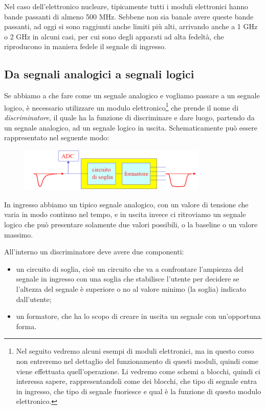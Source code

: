 Nel caso dell'elettronico nucleare, tipicamente tutti i moduli elettronici hanno bande passanti di almeno 500 MHz. Sebbene non sia banale avere queste bande passanti, ad oggi si sono raggiunti anche limiti più alti, arrivando anche a 1 GHz o 2 GHz in alcuni casi, per cui sono degli apparati ad alta fedeltà, che riproducono in maniera fedele il segnale di ingresso.

\subsection{Da segnali analogici a segnali logici}
Se abbiamo a che fare come un segnale analogico e vogliamo passare a un segnale logico, è necessario utilizzare un modulo elettronico\footnote{Nel seguito vedremo alcuni esempi di moduli elettronici, ma in questo corso non entreremo nel dettaglio del funzionamento di questi moduli, quindi come viene effettuata quell'operazione. Li vedremo come schemi a blocchi, quindi ci interessa sapere, rappresentandoli come dei blocchi, che tipo di segnale entra in ingresso, che tipo di segnale fuoriesce e qual è la funzione di questo modulo elettronico.} che prende il nome di \textit{discriminatore}, il quale ha la funzione di discriminare e dare luogo, partendo da un segnale analogico, ad un segnale logico in uscita. Schematicamente può essere rappresentato nel seguente modo:
\begin{figure}[H]
   \centering
   \includegraphics[width=0.8\textwidth]{immagini/discriminatore.png}
\end{figure}
In ingresso abbiamo un tipico segnale analogico, con un valore di tensione che varia in modo continuo nel tempo, e in uscita invece ci ritroviamo un segnale logico che può presentare solamente due valori possibili, o la baseline o un valore massimo.

All'interno un discriminatore deve avere due componenti:
\begin{itemize}[leftmargin=0.5cm]
   \item un circuito di soglia, cioè un circuito che va a confrontare l'ampiezza del segnale in ingresso con una soglia che stabilisce l'utente per decidere se l'altezza del segnale è superiore o no al valore minimo (la soglia) indicato dall'utente;
   \item un formatore, che ha lo scopo di creare in uscita un segnale con un'opportuna forma.
\end{itemize}

